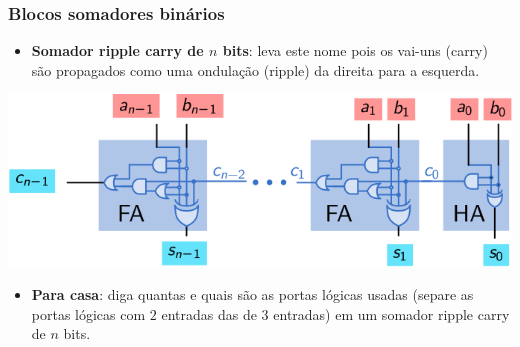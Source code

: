 \documentclass{beamer}
\begin{document}
\begin{frame}
\frametitle{Blocos somadores binários}

\begin{itemize}
\item \textbf{Somador ripple carry de $n$ bits}: leva este nome pois os
vai-uns (carry) são propagados como uma ondulação (ripple) da direita para
a esquerda.
\end{itemize}

\begin{center}
\includegraphics{images/somador}
\end{center}

\begin{itemize}
\item \textbf{Para casa}: diga quantas e quais são as portas lógicas usadas
(separe as portas lógicas com $2$ entradas das de $3$ entradas) em um
somador ripple carry de $n$ bits.
\end{itemize}

\end{frame}

\end{document}
